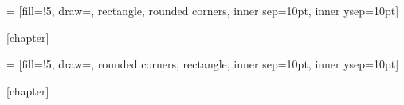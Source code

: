  = [fill=\thmcolorfill!5,
                         draw=\thmcolorborder,
    rectangle, rounded corners, inner sep=10pt, inner ysep=10pt]

\newcommand{\thm}[2][]
{\stepcounter{thmcounter}
 \setlength{\netlength}{\textwidth}
 \addtolength{\netlength}{-20pt}
 
 \medskip\noindent
 \begin{tikzpicture}
   \node[tboxstyle] (dbox)
   {\begin{minipage}{\netlength}
    \ifthenelse{\equal{#1}{\empty}}{\smallskip}{\medskip}
    #2
    \end{minipage}
    };
   \node at (dbox.north west) [xshift=2mm, anchor=west, fill=white, text=\thmcolorborder, top color=white, bottom color=\thmcolorfill!5, rounded corners]
   {\textbf{\large Théorème \arabic{thmcounter}}
    \ifthenelse{\equal{#1}{\empty}}{}{{\large(#1)}}
    };
 \end{tikzpicture}
 }



[chapter]

 = [fill=\propcolorfill!5,
                         draw=\propcolorborder,
                         rounded corners,
    rectangle, inner sep=10pt, inner ysep=10pt]

\newcommand{\prop}[2][]
{\stepcounter{propcounter}
 \setlength{\netlength}{\textwidth}
 \addtolength{\netlength}{-20pt}
 
 \medskip\noindent
 \begin{tikzpicture}
   \node[pboxstyle] (dbox)
   {\begin{minipage}{\netlength}
    \ifthenelse{\equal{#1}{\empty}}{\smallskip}{\medskip}
    #2
    \end{minipage}
    };
   \node at (dbox.north west) [xshift=2mm, anchor=west, fill=white, text=\propcolorborder, top color=white, bottom color=\propcolorfill!5, rounded corners]
   {\textbf{\large Propriété \arabic{propcounter}}
    \ifthenelse{\equal{#1}{\empty}}{}{{\large(#1)}}
    };
 \end{tikzpicture}
 }


[chapter]

